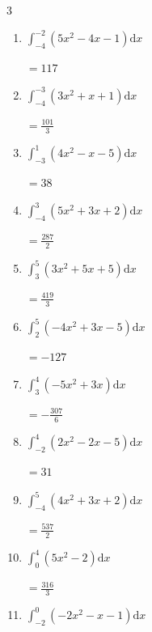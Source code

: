 \begin{multicols}{3}
\begin{enumerate}
        $\displaystyle =\frac{55}{6}$

  \item $\displaystyle \int_{-4}^{-2}\left( 5x^{2}-4x-1 \right) \mathrm{d}x$

        $\displaystyle =117$

  \item $\displaystyle \int_{-4}^{-3}\left( 3x^{2}+x+1 \right) \mathrm{d}x$

        $\displaystyle =\frac{101}{3}$

  \item $\displaystyle \int_{-3}^{1}\left( 4x^{2}-x-5 \right) \mathrm{d}x$

        $\displaystyle =38$

\columnbreak %

  \item $\displaystyle \int_{-4}^{3}\left( 5x^{2}+3x+2 \right) \mathrm{d}x$

        $\displaystyle =\frac{287}{2}$

  \item $\displaystyle \int_{3}^{5}\left( 3x^{2}+5x+5 \right) \mathrm{d}x$

        $\displaystyle =\frac{419}{3}$

  \item $\displaystyle \int_{2}^{5}\left( -4x^{2}+3x-5 \right) \mathrm{d}x$

        $\displaystyle =-127$

  \item $\displaystyle \int_{3}^{4}\left( -5x^{2}+3x \right) \mathrm{d}x$

        $\displaystyle =-\frac{307}{6}$

  \item $\displaystyle \int_{-2}^{4}\left( 2x^{2}-2x-5 \right) \mathrm{d}x$

        $\displaystyle =31$

\columnbreak %

\resetques

  \item $\displaystyle \int_{-4}^{5}\left( 4x^{2}+3x+2 \right) \mathrm{d}x$

        $\displaystyle =\frac{537}{2}$

  \item $\displaystyle \int_{0}^{4}\left( 5x^{2}-2 \right) \mathrm{d}x$

        $\displaystyle =\frac{316}{3}$

  \item $\displaystyle \int_{-2}^{0}\left( -2x^{2}-x-1 \right) \mathrm{d}x$


\end{enumerate}
\end{multicols}
